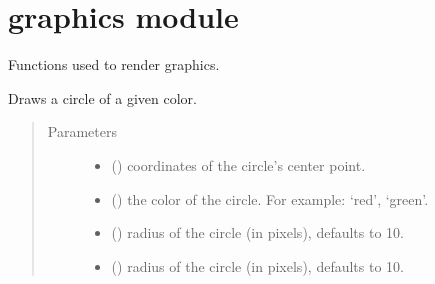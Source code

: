 \documentclass[a4paper,11pt,oneside,english]{sphinxmanual}
\begin{document}
\chapter{graphics module}
\label{\detokenize{graphics:module-graphics}}\label{\detokenize{graphics:graphics-module}}\label{\detokenize{graphics::doc}}\label{\detokenize{graphics:module-0}}
Functions used to render graphics.

\bigskip 
\bigskip 


\begin{fulllineitems}
\label{\detokenize{graphics:graphics.draw_circle}}
Draws a circle of a given color.
\begin{quote}\begin{description}
\item[{Parameters}] \leavevmode\begin{itemize}
\item {} 
 () \textendash{} coordinates of the circle’s center point.

\item {} 
 () \textendash{} the color of the circle. For example: ‘red’, ‘green’.

\item {} 
 (\sphinxstyleliteralemphasis{\sphinxupquote{, }}) \textendash{} radius of the circle (in pixels), defaults to 10.

\item {} 
 (\sphinxstyleliteralemphasis{\sphinxupquote{, }}) \textendash{} radius of the circle (in pixels), defaults to 10.

\end{itemize}

\end{description}\end{quote}

\bigskip 
\bigskip 

\end{fulllineitems}
\end{document}
